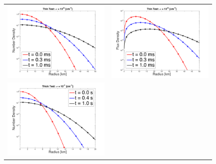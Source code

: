 \documentclass[10pt,preprint]{aastex}
\begin{document}
\begin{figure}
  \begin{center}
    \begin{tabular}{cc}
      \includegraphics[scale=0.38]{./Figures/GaussianSphericalDiffusion_Kappa_1e-5_Density} &
      \includegraphics[scale=0.38]{./Figures/GaussianSphericalDiffusion_Kappa_1e-5_Flux} \\
      \includegraphics[scale=0.38]{./Figures/GaussianSphericalDiffusion_Kappa_1e-1_Density} &

\end{tabular}
\end{center}
\end{figure}
\end{document}
